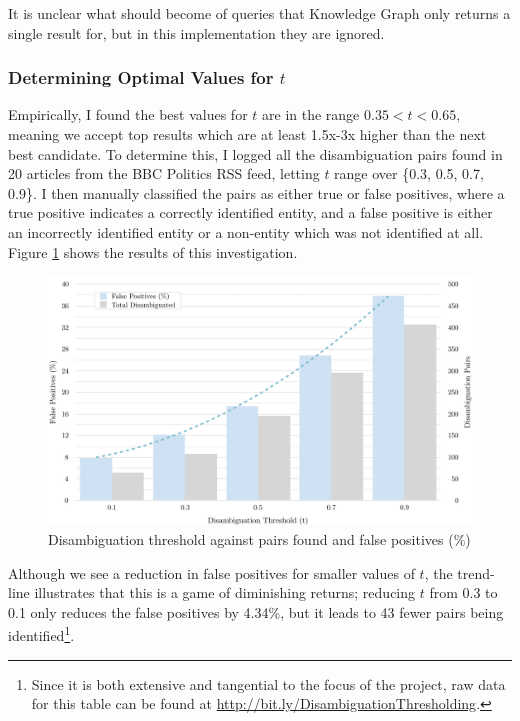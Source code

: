 It is unclear what should become of queries that Knowledge Graph only returns a single result for, but in this implementation they are ignored.

\subsubsection{Determining Optimal Values for $t$}

Empirically, I found the best values for $t$ are in the range $0.35 < t < 0.65$, meaning we accept top results which are at least 1.5x-3x higher than the next best candidate. To determine this, I logged all the disambiguation pairs found in 20 articles from the BBC Politics RSS feed, letting $t$ range over \{0.3, 0.5, 0.7, 0.9\}. I then manually classified the pairs as either true or false positives, where a true positive indicates a correctly identified entity, and a false positive is either an incorrectly identified entity or a non-entity which was not identified at all. Figure \ref{fig:dthreshold} shows the results of this investigation.

\begin{figure}[htbp!]
	\centering
	\includegraphics[width=\textwidth]{img/implementation/DisambiguationThreshold.pdf}
	\caption{Disambiguation threshold against pairs found and false positives (\%)}
	\label{fig:dthreshold}
\end{figure}

Although we see a reduction in false positives for smaller values of $t$, the trend-line illustrates that this is a game of diminishing returns; reducing $t$ from 0.3 to 0.1 only reduces the false positives by 4.34\%, but it leads to 43 fewer pairs being identified\footnote{Since it is both extensive and tangential to the focus of the project, raw data for this table can be found at \url{http://bit.ly/DisambiguationThresholding}.}. 

